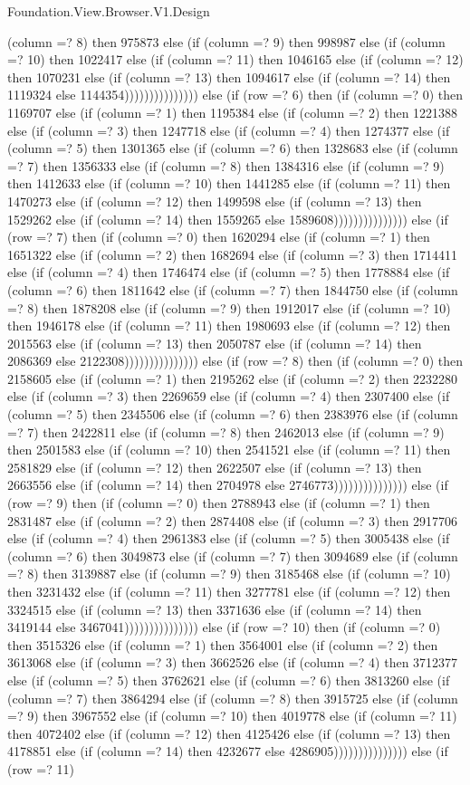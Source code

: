 \begin{lexlean}{Foundation.View.Browser.V1.Design}
\begin{semanticmodule}
{(column =? 8) then 975873 else (if (column =? 9) then 998987 else (if (column =? 10) then 1022417 else (if (column =? 11) then 1046165 else (if (column =? 12) then 1070231 else (if (column =? 13) then 1094617 else (if (column =? 14) then 1119324 else 1144354))))))))))))))) else (if (row =? 6) then (if (column =? 0) then 1169707 else (if (column =? 1) then 1195384 else (if (column =? 2) then 1221388 else (if (column =? 3) then 1247718 else (if (column =? 4) then 1274377 else (if (column =? 5) then 1301365 else (if (column =? 6) then 1328683 else (if (column =? 7) then 1356333 else (if (column =? 8) then 1384316 else (if (column =? 9) then 1412633 else (if (column =? 10) then 1441285 else (if (column =? 11) then 1470273 else (if (column =? 12) then 1499598 else (if (column =? 13) then 1529262 else (if (column =? 14) then 1559265 else 1589608))))))))))))))) else (if (row =? 7) then (if (column =? 0) then 1620294 else (if (column =? 1) then 1651322 else (if (column =? 2) then 1682694 else (if (column =? 3) then 1714411 else (if (column =? 4) then 1746474 else (if (column =? 5) then 1778884 else (if (column =? 6) then 1811642 else (if (column =? 7) then 1844750 else (if (column =? 8) then 1878208 else (if (column =? 9) then 1912017 else (if (column =? 10) then 1946178 else (if (column =? 11) then 1980693 else (if (column =? 12) then 2015563 else (if (column =? 13) then 2050787 else (if (column =? 14) then 2086369 else 2122308))))))))))))))) else (if (row =? 8) then (if (column =? 0) then 2158605 else (if (column =? 1) then 2195262 else (if (column =? 2) then 2232280 else (if (column =? 3) then 2269659 else (if (column =? 4) then 2307400 else (if (column =? 5) then 2345506 else (if (column =? 6) then 2383976 else (if (column =? 7) then 2422811 else (if (column =? 8) then 2462013 else (if (column =? 9) then 2501583 else (if (column =? 10) then 2541521 else (if (column =? 11) then 2581829 else (if (column =? 12) then 2622507 else (if (column =? 13) then 2663556 else (if (column =? 14) then 2704978 else 2746773))))))))))))))) else (if (row =? 9) then (if (column =? 0) then 2788943 else (if (column =? 1) then 2831487 else (if (column =? 2) then 2874408 else (if (column =? 3) then 2917706 else (if (column =? 4) then 2961383 else (if (column =? 5) then 3005438 else (if (column =? 6) then 3049873 else (if (column =? 7) then 3094689 else (if (column =? 8) then 3139887 else (if (column =? 9) then 3185468 else (if (column =? 10) then 3231432 else (if (column =? 11) then 3277781 else (if (column =? 12) then 3324515 else (if (column =? 13) then 3371636 else (if (column =? 14) then 3419144 else 3467041))))))))))))))) else (if (row =? 10) then (if (column =? 0) then 3515326 else (if (column =? 1) then 3564001 else (if (column =? 2) then 3613068 else (if (column =? 3) then 3662526 else (if (column =? 4) then 3712377 else (if (column =? 5) then 3762621 else (if (column =? 6) then 3813260 else (if (column =? 7) then 3864294 else (if (column =? 8) then 3915725 else (if (column =? 9) then 3967552 else (if (column =? 10) then 4019778 else (if (column =? 11) then 4072402 else (if (column =? 12) then 4125426 else (if (column =? 13) then 4178851 else (if (column =? 14) then 4232677 else 4286905))))))))))))))) else (if (row =? 11) }
\end{semanticmodule}
\end{lexlean}
